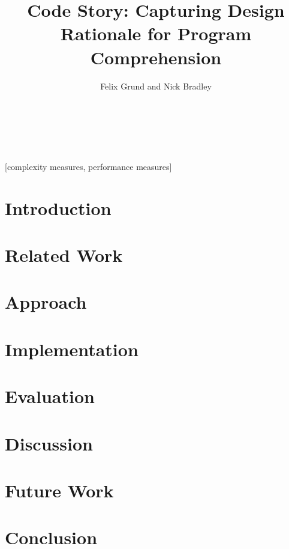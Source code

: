 \documentclass{sig-alternate}
\begin{document}
\title{Code Story: Capturing Design Rationale for Program Comprehension}

\author{
\alignauthor
Felix Grund and Nick Bradley \\
       \\
       \\
       \\
}
\maketitle

\begin{abstract}
  
\end{abstract}

[complexity measures, performance measures]



\section{Introduction}
  \label{sec:introduction}
  
\section{Related Work}
  \label{sec:related-work}
  
\section{Approach}
  \label{sec:approach}
  
\section{Implementation}
  \label{sec:implementation}
  
\section{Evaluation}
  \label{sec:evaluation}
  
\section{Discussion}
  \label{sec:discussion}
  
\section{Future Work}
  \label{sec:future-work}
  
\section{Conclusion}
  \label{sec:conclusion}
  

  
  
\end{document}
